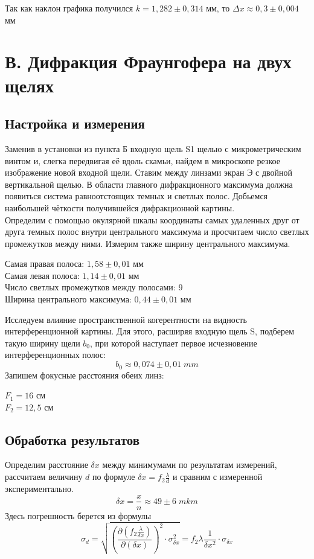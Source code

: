 \documentclass[a4paper]{article}
\begin{document}
Так как наклон графика получился $k = 1,282 \pm 0,314$ мм, то $\Delta x \approx 0,3 \pm 0,004$ мм\\
\section{В. Дифракция Фраунгофера на двух щелях}
\subsection*{Настройка и измерения}
Заменив в установки из пункта Б входную щель S1 щелью с микрометрическим винтом и, слегка передвигая её вдоль скамьи, найдем в микроскопе резкое изображение новой входной щели. Ставим между линзами экран Э с двойной вертикальной щелью. В области главного дифракционного максимума должна появиться система равноотстоящих темных и светлых полос. Добьемся наибольшей чёткости получившейся дифракционной картины.\\
Определим с помощью окулярной шкалы координаты самых удаленных друг от друга темных полос внутри центрального максимума и просчитаем число светлых промежутков между ними. Измерим также ширину центрального максимума.
\begin{center}
Самая правая полоса: $1,58 \pm 0,01$ мм\\
Самая левая полоса: $1,14 \pm 0,01$ мм\\
Число светлых промежутков между полосами: $9$\\
Ширина центрального максимума: $0,44 \pm 0,01$ мм\\
\end{center}
Исследуем влияние пространственной когерентности на видность интерференционной картины. Для этого, расширяя входную щель S, подберем такую ширину щели $b_0$, при которой наступает первое исчезновение интерференционных полос:
$$b_0 \approx 0,074 \pm 0,01 \; mm$$
Запишем фокусные расстояния обеих линз:
\begin{center}
$F_1 = 16$ см\\
$F_2 = 12,5$ см\\
\end{center}
\subsection*{Обработка результатов}
Определим расстояние $\delta x$ между минимумами по результатам измерений, рассчитаем величину $d$ по формуле $\delta x = f_2 \frac{\lambda}{d}$ и сравним с измеренной экспериментально.\\
$$\delta x = \frac{x}{n} \approx 49 \pm 6 \; mkm$$
Здесь погрешность берется из формулы
	$$\sigma_d =  \sqrt{\left(\frac{\partial \left(f_2 \frac{\lambda}{\delta x}  \right)}{\partial \left(\delta x\right)}\right)^{2} \cdot \sigma_{\delta x}^2} = f_2\lambda \frac{1}{\delta x^2} \cdot \sigma_{\delta x}$$
\end{document}
